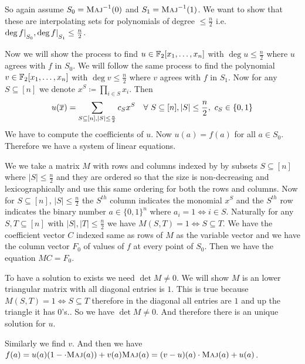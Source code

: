\begin{proof-of-theorem}
	So again assume $S_0=\textsc{Maj}^{-1}(0)$ and $S_1=\textsc{Maj}^{-1}(1)$. We want to show that these are interpolating sets for polynomials of degree $\leq \frac{n}{2}$ i.e. $\deg f|\strut_{S_0},\deg f|\strut_{S_1}\leq \frac{n}{2}$. 
	
	Now we will show the process to find $u\in\mathbb{F}_2[x_1,\dots, x_n]$ with $\deg u\leq \frac{n}{2}$ where $u$ agrees with $f$ in $S_0$. We will follow the same process to find the polynomial $v\in\mathbb{F}_2[x_1,\dots, x_n]$ with $\deg v\leq \frac{n}{2}$ where $v$ agrees with $f$ in $S_1$. Now for any $S\subseteq [n]$ we denote $x^S\coloneqq \prod\limits_{i\in S}x_i$. Then $$u(\ovx)=\sum_{S\subseteq[n], |S|\leq \frac{n}{2}}c_Sx^S\quad \forall \ S\subseteq[n],|S|\leq\frac{n}{2},\  c_S\in\{0,1\}$$We have to compute the coefficients of $u$. Now $u(a)=f(a)$ for all $a\in S_0$. Therefore we have a system of linear equations. 
	
	We we take a matrix $M$ with rows and columns indexed by by subsets $S\subseteq [n]$ where $|S|\leq\frac{n}{2}$ and they are ordered so that the size is non-decreasing and lexicographically and use this same ordering for both the rows and columns. Now for $S\subseteq [n]$, $|S|\leq \frac{n}{2}$ the $S^{th}$ column indicates the monomial $x^S$ and the $S^{th}$ row indicates the binary number $a\in\{0,1\}^n$ where $a_i=1\iff i\in S$. Naturally for any $S,T\subseteq [n]$ with $|S|,|T|\leq\frac{n}2$ we have $M(S,T) =1\iff S\subseteq T$. We have the coefficient vector $C$ indexed same as rows of $M$ as the variable vector and we have the column vector $F_0$ of values of $f$ at every point of $S_0$. Then we have the equation $MC=F_0$. 
	
	To have a solution to exists we need $\det M\neq0$. We will show $M$ is an lower triangular matrix with all diagonal entries is $1$. This is true because $M(S,T)=1\iff S\subseteq T$ therefore in the diagonal all entries are $1$ and up the triangle it has $0$'s.. So we have $\det M\neq 0$. And therefore there is an unique solution for $u$. 
	
	Similarly we find $v$. And then we have $f(a)=u(a)(1-\cdot\textsc{Maj}(a))+v(a)\textsc{Maj}(a)=(v-u)(a)\cdot \textsc{Maj}(a)+u(a)$. 
\end{proof-of-theorem}